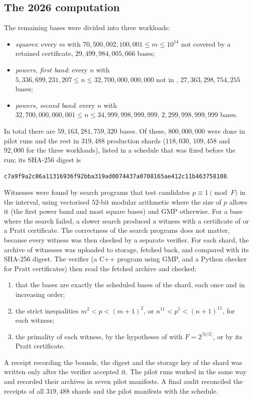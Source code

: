 \documentclass[11pt,colorlinks]{charlie}
\begin{document}
\subsection{The 2026 computation}
The remaining bases were divided into three workloads:
\begin{itemize}
\item \emph{squares}: every $m$ with $70{,}500{,}002{,}100{,}001\le m\le10^{14}$ not covered by a retained certificate, $29{,}499{,}984{,}005{,}066$ bases;
\item \emph{powers, first band}: every $n$ with $5{,}336{,}699{,}231{,}207\le n\le32{,}700{,}000{,}000{,}000$ not in , $27{,}363{,}298{,}754{,}255$ bases;
\item \emph{powers, second band}: every $n$ with $32{,}700{,}000{,}000{,}001\le n\le34{,}999{,}998{,}999{,}999$, $2{,}299{,}998{,}999{,}999$ bases.
\end{itemize}
In total there are $59{,}163{,}281{,}759{,}320$ bases. Of these, $800{,}000{,}000$ were done in pilot runs and the rest in $319{,}488$ production shards ($118{,}030$, $109{,}458$ and $92{,}000$ for the three workloads), listed in a schedule that was fixed before the run; its SHA-256 digest is
\begin{center}\footnotesize
\texttt{c7a9f9a2c86a11316936f92bba319ad0074437a0708165ae412c11b463758108}.
\end{center}

Witnesses were found by search programs that test candidates $p\equiv1\pmod F$ in the interval, using vectorised $52$-bit modular arithmetic where the size of $p$ allows it (the first power band and most square bases) and GMP otherwise. For a base where the search failed, a slower search produced a witness with a certificate of  or a Pratt certificate. The correctness of the search programs does not matter, because every witness was then checked by a separate verifier. For each shard, the archive of witnesses was uploaded to storage, fetched back, and compared with its SHA-256 digest. The verifier (a C++ program using GMP, and a Python checker for Pratt certificates) then read the fetched archive and checked:
\begin{enumerate}
\item that the bases are exactly the scheduled bases of the shard, each once and in increasing order;
\item the strict inequalities $m^2<p<(m+1)^2$, or $n^{11}<p^5<(n+1)^{11}$, for each witness;
\item the primality of each witness, by the hypotheses of  with $F=2^{\lceil b/3\rceil}$, or by its Pratt certificate.
\end{enumerate}
A receipt recording the bounds, the digest and the storage key of the shard was written only after the verifier accepted it. The pilot runs worked in the same way and recorded their archives in seven pilot manifests. A final audit reconciled the receipts of all $319{,}488$ shards and the pilot manifests with the schedule.
\end{document}

